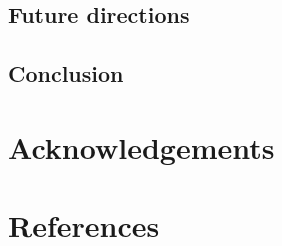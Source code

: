 \documentclass[floatsintext,man]{apa6}
\theoremstyle{definition}
\theoremstyle{definition}
\theoremstyle{definition}
\theoremstyle{remark}
\begin{document}
\subsection{Future directions}\label{disc-future}

\subsection{Conclusion}\label{disc-conclusion}

\section{Acknowledgements}\label{acknowledgements}

\newpage

\section{References}\label{refs}

\begingroup
\setlength{\parindent}{-0.5in} \setlength{\leftskip}{0.5in}

\hypertarget{refs}{}

\endgroup
\end{document}
